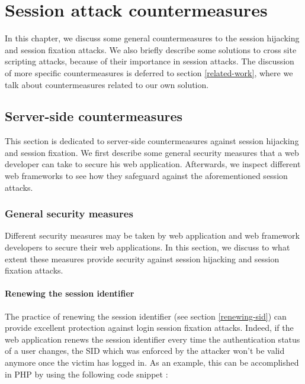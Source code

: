 \chapter{Session attack countermeasures}

In this chapter, we discuss some general countermeasures to the session hijacking and session fixation attacks. We also briefly describe some solutions to cross site scripting attacks, because of their importance in session attacks. The discussion of more specific countermeasures is deferred to section \ref{related-work}, where we talk about countermeasures related to our own solution. %

\section{Server-side countermeasures}

This section is dedicated to server-side countermeasures against session hijacking and session fixation. We first describe some general security measures that a web developer can take to secure his web application. Afterwards, we inspect different web frameworks to see how they safeguard against the aforementioned session attacks.

\subsection{General security measures}\label{general-security}

Different security measures may be taken by web application and web framework developers to secure their web applications. In this section, we discuss to what extent these measures provide security against session hijacking and session fixation attacks.

\subsubsection{Renewing the session identifier}

The practice of renewing the session identifier (see section \ref{renewing-sid}) can provide excellent protection against \gls{login session fixation} attacks. Indeed, if the web application renews the session identifier every time the authentication status of a user changes, the SID which was enforced by the attacker won't be valid anymore once the victim has logged in. As an example, this can be accomplished in PHP by using the following code snippet \cite{PHPregenerate,Johns2011}:

